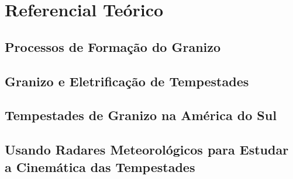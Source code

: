 \chapter{Referencial Teórico}\label{teoria}

\section{Processos de Formação do Granizo}

\section{Granizo e Eletrificação de Tempestades}\label{granizo_eletrificacao}

\section{Tempestades de Granizo na América do Sul}

\section{Usando Radares Meteorológicos para Estudar a Cinemática das Tempestades}

